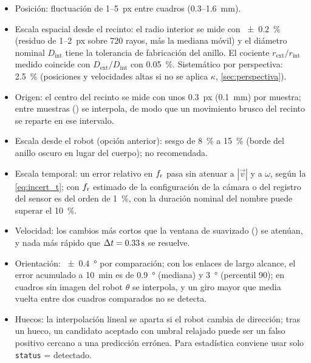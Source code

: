 \begin{itemize}
  \item Posición: fluctuación de 1--\SI{5}{px} entre cuadros (\num{0.3}--\SI{1.6}{\milli\metre}).
  \item Escala espacial desde el recinto: el radio interior se mide con \SI{\pm 0.2}{\percent}
        (residuo de 1--\SI{2}{px} sobre \num{720} rayos, más la mediana móvil) y el diámetro nominal
        $D_{\mathrm{int}}$ tiene la tolerancia de fabricación del anillo. El cociente
        $r_{\mathrm{ext}}/r_{\mathrm{int}}$ medido coincide con $D_{\mathrm{ext}}/D_{\mathrm{int}}$ con
        \SI{0.05}{\percent}. Sistemático por perspectiva: \SI{2.5}{\percent} (posiciones y velocidades
        altas si no se aplica $\kappa$, \cref{sec:perspectiva}).
  \item Origen: el centro del recinto se mide con unos \SI{0.3}{px} (\SI{0.1}{\milli\metre}) por
        muestra; entre muestras () se interpola, de modo que un movimiento brusco del recinto
        se reparte en ese intervalo.
  \item Escala desde el robot (opción anterior): sesgo de \SI{+8}{\percent} a \SI{+15}{\percent}
        (borde del anillo oscuro en lugar del cuerpo); no recomendada.
  \item Escala temporal: un error relativo en $f_{\mathrm{r}}$ pasa sin atenuar a $|\vec v|$ y a $\omega$,
        según la \cref{eq:incert_t}; con $f_{\mathrm{r}}$ estimado de la configuración de la cámara o del registro del
        sensor es del orden de \SI{1}{\percent}, con la duración nominal del nombre puede superar el
        \SI{10}{\percent}.
  \item Velocidad: los cambios más cortos que la ventana de suavizado () se atenúan, y nada
        más rápido que $\Delta t = \EnSeg{1}$ se resuelve.
  \item Orientación: \SI{\pm 0.4}{\degree} por comparación; con los enlaces de largo alcance, el error
        acumulado a \SI{10}{\minute} es de \SI{0.9}{\degree} (mediana) y \SI{3}{\degree} (percentil 90); en cuadros
        sin imagen del robot $\theta$ se interpola, y un giro mayor que media vuelta entre dos
        cuadros comparados no se detecta.
  \item Huecos: la interpolación lineal se aparta si el robot cambia de dirección; tras un hueco, un
        candidato aceptado con umbral relajado puede ser un falso positivo cercano a una predicción
        errónea. Para estadística conviene usar solo \texttt{status} = detectado.
\end{itemize}
